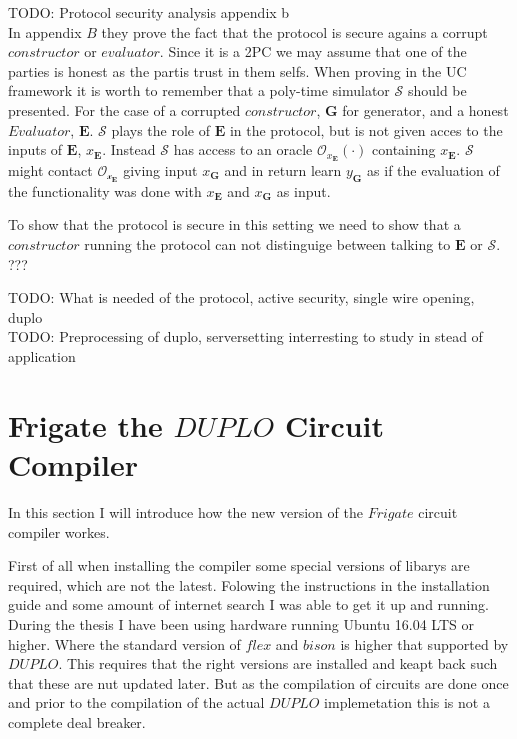 \documentclass[twoside,11pt,openright]{report}
\newcommand{\todo}[1]{}
\renewcommand{\todo}[1]{{\color{red} TODO: {#1}} \\}
\begin{document}
\todo{Protocol security analysis appendix b}
In appendix $B$ they prove the fact that the protocol is secure agains a corrupt $constructor$ or $evaluator$. Since it is a 2PC we may assume that one of the parties is honest as the partis trust in them selfs. When proving in the UC framework it is worth to remember that a poly-time simulator $\mathcal{S}$ should be presented. For the case of a corrupted $constructor$, $\mathbf{G}$ for generator, and a honest $Evaluator$, $\mathbf{E}$. $\mathcal{S}$ plays the role of $\mathbf{E}$ in the protocol, but is not given acces to the inputs of $\mathbf{E}$, $x_{\mathbf{E}}$. Instead $\mathcal{S}$ has access to an oracle $\mathcal{O}_{x_{\mathbf{E}}}(\cdot)$ containing $x_{\mathbf{E}}$. $\mathcal{S}$ might contact $\mathcal{O_{x_{\mathbf{E}}}}$ giving input $x_{\mathbf{G}}$ and in return learn $y_{\mathbf{G}}$ as if the evaluation of the functionality was done with $x_{\mathbf{E}}$ and $x_{\mathbf{G}}$ as input.

To show that the protocol is secure in this setting we need to show that a $constructor$ running the protocol can not distinguige between talking to $\mathbf{E}$ or $\mathcal{S}$. ???  

\todo{What is needed of the protocol, active security, single wire opening, duplo}

\todo{Preprocessing of duplo, serversetting interresting to study in stead of application}

\section{Frigate the $DUPLO$ Circuit Compiler}
In this section I will introduce how the new version of the $Frigate$ circuit compiler workes.

First of all when installing the compiler some special versions of libarys are required, which are not the latest. Folowing the instructions in the installation guide and some amount of internet search I was able to get it up and running. During the thesis I have been using hardware running Ubuntu 16.04 LTS or higher. Where the standard version of $flex$ and $bison$ is higher that supported by $DUPLO$. This requires that the right versions are installed and keapt back such that these are nut updated later. But as the compilation of circuits are done once and prior to the compilation of the actual $DUPLO$ implemetation this is not a complete deal breaker.
\end{document}
